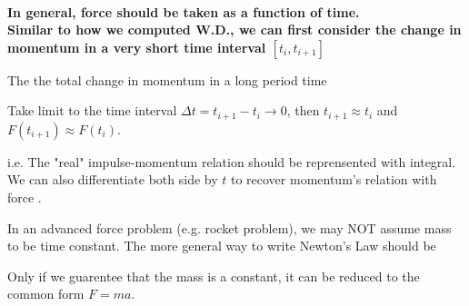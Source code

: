 \documentclass[class=article, crop=false, 12pt]{standalone}
\begin{document}
\hfill \\
\bf{In general, force should be taken as a function of time.} \\

Similar to how we computed W.D., 
we can first consider the change in momentum in a very short time interval $[t_i, t_{i+1}]$

The the total change in momentum in a long period time 

Take limit to the time interval $\Delta t = t_{i+1}-t_i \to 0$, then $t_{i+1}\approx t_i$ and $F(t_{i+1})\approx F(t_i)$.

i.e. The "real" impulse-momentum relation should be reprensented with integral.
We can also differentiate both side by $t$ to recover momentum's relation with force . 

In an advanced force problem (e.g. rocket problem), we may NOT assume mass to be time constant. 
The more general way to write Newton's  Law should be 

Only if we guarentee that the mass is a constant, it can be reduced to the common form $F=ma$.

\theend
\end{document}
